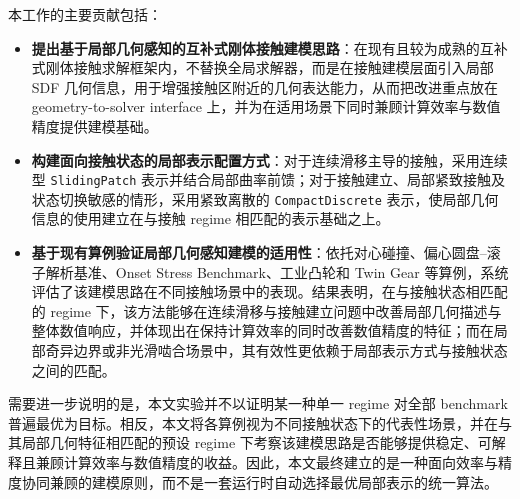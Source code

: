 本工作的主要贡献包括：
\begin{itemize}
    \item \textbf{提出基于局部几何感知的互补式刚体接触建模思路}：在现有且较为成熟的互补式刚体接触求解框架内，不替换全局求解器，而是在接触建模层面引入局部 SDF 几何信息，用于增强接触区附近的几何表达能力，从而把改进重点放在 geometry-to-solver interface 上，并为在适用场景下同时兼顾计算效率与数值精度提供建模基础。
    \item \textbf{构建面向接触状态的局部表示配置方式}：对于连续滑移主导的接触，采用连续型 \texttt{SlidingPatch} 表示并结合局部曲率前馈；对于接触建立、局部紧致接触及状态切换敏感的情形，采用紧致离散的 \texttt{CompactDiscrete} 表示，使局部几何信息的使用建立在与接触 regime 相匹配的表示基础之上。
    \item \textbf{基于现有算例验证局部几何感知建模的适用性}：依托对心碰撞、偏心圆盘--滚子解析基准、Onset Stress Benchmark、工业凸轮和 Twin Gear 等算例，系统评估了该建模思路在不同接触场景中的表现。结果表明，在与接触状态相匹配的 regime 下，该方法能够在连续滑移与接触建立问题中改善局部几何描述与整体数值响应，并体现出在保持计算效率的同时改善数值精度的特征；而在局部奇异边界或非光滑啮合场景中，其有效性更依赖于局部表示方式与接触状态之间的匹配。
\end{itemize}

需要进一步说明的是，本文实验并不以证明某一种单一 regime 对全部 benchmark 普遍最优为目标。相反，本文将各算例视为不同接触状态下的代表性场景，并在与其局部几何特征相匹配的预设 regime 下考察该建模思路是否能够提供稳定、可解释且兼顾计算效率与数值精度的收益。因此，本文最终建立的是一种面向效率与精度协同兼顾的建模原则，而不是一套运行时自动选择最优局部表示的统一算法。
